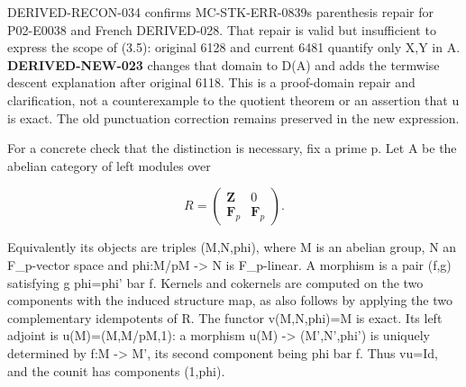 DERIVED-RECON-034 confirms MC-STK-ERR-0839\textquotesingle s parenthesis repair for P02-E0038 and French DERIVED-028. That repair is valid but insufficient to express the scope of (3.5)\allowbreak{}:\allowbreak{} original 6128 and current 6481 quantify only X,\allowbreak{}Y in A. \textbf{DERIVED-NEW-023} changes that domain to D(A)\allowbreak{} and adds the termwise descent explanation after original 6118. This is a proof-domain repair and clarification,\allowbreak{} not a counterexample to the quotient theorem or an assertion that u is exact. The old punctuation correction remains preserved in the new expression.

For a concrete check that the distinction is necessary,\allowbreak{} fix a prime p. Let A be the abelian category of left modules over

\[
 R=\begin{pmatrix}\mathbf Z&0\\\mathbf F_p&\mathbf F_p\end{pmatrix}.
\]

Equivalently its objects are triples (M,\allowbreak{}N,\allowbreak{}phi)\allowbreak{},\allowbreak{} where M is an abelian group,\allowbreak{} N an F\_\allowbreak{}p-vector space and phi:\allowbreak{}M/\allowbreak{}pM \allowbreak{}-> N is F\_\allowbreak{}p-linear. A morphism is a pair (f,\allowbreak{}g)\allowbreak{} satisfying g phi\allowbreak{}=phi' bar f. Kernels and cokernels are computed on the two components with the induced structure map,\allowbreak{} as also follows by applying the two complementary idempotents of R. The functor v(M,\allowbreak{}N,\allowbreak{}phi)\allowbreak{}\allowbreak{}=M is exact. Its left adjoint is u(M)\allowbreak{}\allowbreak{}=(M,\allowbreak{}M/\allowbreak{}pM,\allowbreak{}1)\allowbreak{}:\allowbreak{} a morphism u(M)\allowbreak{} \allowbreak{}-> (M',\allowbreak{}N',\allowbreak{}phi')\allowbreak{} is uniquely determined by f:\allowbreak{}M \allowbreak{}-> M',\allowbreak{} its second component being phi\textquotesingle{} bar f. Thus vu\allowbreak{}=Id,\allowbreak{} and the counit has components (1,\allowbreak{}phi)\allowbreak{}.

